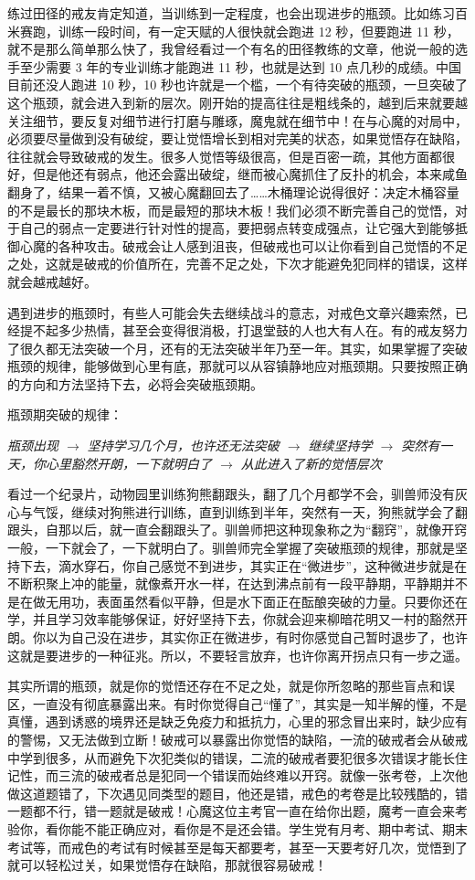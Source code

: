练过田径的戒友肯定知道，当训练到一定程度，也会出现进步的瓶颈。比如练习百米赛跑，训练一段时间，有一定天赋的人很快就会跑进 12 秒，但要跑进 11 秒，就不是那么简单那么快了，我曾经看过一个有名的田径教练的文章，他说一般的选手至少需要 3 年的专业训练才能跑进 11 秒，也就是达到 10 点几秒的成绩。中国目前还没人跑进 10 秒，10 秒也许就是一个槛，一个有待突破的瓶颈，一旦突破了这个瓶颈，就会进入到新的层次。刚开始的提高往往是粗线条的，越到后来就要越关注细节，要反复对细节进行打磨与雕琢，魔鬼就在细节中！在与心魔的对局中，必须要尽量做到没有破绽，要让觉悟增长到相对完美的状态，如果觉悟存在缺陷，往往就会导致破戒的发生。很多人觉悟等级很高，但是百密一疏，其他方面都很好，但是他还有弱点，他还会露出破绽，继而被心魔抓住了反扑的机会，本来咸鱼翻身了，结果一着不慎，又被心魔翻回去了……木桶理论说得很好：决定木桶容量的不是最长的那块木板，而是最短的那块木板！我们必须不断完善自己的觉悟，对于自己的弱点一定要进行针对性的提高，要把弱点转变成强点，让它强大到能够抵御心魔的各种攻击。破戒会让人感到沮丧，但破戒也可以让你看到自己觉悟的不足之处，这就是破戒的价值所在，完善不足之处，下次才能避免犯同样的错误，这样就会越戒越好。

遇到进步的瓶颈时，有些人可能会失去继续战斗的意志，对戒色文章兴趣索然，已经提不起多少热情，甚至会变得很消极，打退堂鼓的人也大有人在。有的戒友努力了很久都无法突破一个月，还有的无法突破半年乃至一年。其实，如果掌握了突破瓶颈的规律，能够做到心里有底，那就可以从容镇静地应对瓶颈期。只要按照正确的方向和方法坚持下去，必将会突破瓶颈期。

瓶颈期突破的规律：

\textit{瓶颈出现 $\to$ 坚持学习几个月，也许还无法突破 $\to$ 继续坚持学 $\to$ 突然有一天，你心里豁然开朗，一下就明白了 $\to$ 从此进入了新的觉悟层次}

看过一个纪录片，动物园里训练狗熊翻跟头，翻了几个月都学不会，驯兽师没有灰心与气馁，继续对狗熊进行训练，直到训练到半年，突然有一天，狗熊就学会了翻跟头，自那以后，就一直会翻跟头了。驯兽师把这种现象称之为“翻窍”，就像开窍一般，一下就会了，一下就明白了。驯兽师完全掌握了突破瓶颈的规律，那就是坚持下去，滴水穿石，你自己感觉不到进步，其实正在“微进步”，这种微进步就是在不断积聚上冲的能量，就像煮开水一样，在达到沸点前有一段平静期，平静期并不是在做无用功，表面虽然看似平静，但是水下面正在酝酿突破的力量。只要你还在学，并且学习效率能够保证，好好坚持下去，你就会迎来柳暗花明又一村的豁然开朗。你以为自己没在进步，其实你正在微进步，有时你感觉自己暂时退步了，也许这就是要进步的一种征兆。所以，不要轻言放弃，也许你离开拐点只有一步之遥。

其实所谓的瓶颈，就是你的觉悟还存在不足之处，就是你所忽略的那些盲点和误区，一直没有彻底暴露出来。有时你觉得自己“懂了”，其实是一知半解的懂，不是真懂，遇到诱惑的境界还是缺乏免疫力和抵抗力，心里的邪念冒出来时，缺少应有的警惕，又无法做到立断！破戒可以暴露出你觉悟的缺陷，一流的破戒者会从破戒中学到很多，从而避免下次犯类似的错误，二流的破戒者要犯很多次错误才能长住记性，而三流的破戒者总是犯同一个错误而始终难以开窍。就像一张考卷，上次他做这道题错了，下次遇见同类型的题目，他还是错，戒色的考卷是比较残酷的，错一题都不行，错一题就是破戒！心魔这位主考官一直在给你出题，魔考一直会来考验你，看你能不能正确应对，看你是不是还会错。学生党有月考、期中考试、期末考试等，而戒色的考试有时候甚至是每天都要考，甚至一天要考好几次，觉悟到了就可以轻松过关，如果觉悟存在缺陷，那就很容易破戒！

